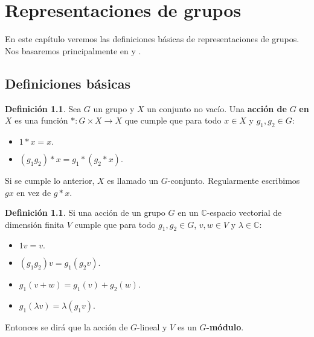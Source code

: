 \documentclass[12pt]{book}
\theoremstyle{definition}
\newtheorem{definition}[theorem]{Definición}
\newcounter{in}
\newcounter{ini}
\begin{document}
\chapter{Representaciones de grupos}
\label{cha:Representaciones de grupos}

En este capítulo veremos las definiciones básicas de representaciones
de grupos. Nos basaremos principalmente en \cite{MR882540} y
\cite{sagan2001symmetric}.

\section{Definiciones básicas}
\label{sec:basicas}

\begin{definition}
  Sea $G$ un grupo y $X$ un conjunto no vacío. Una \textbf{acción de}
  $G$ \textbf{en} $X$ es una función $\ast \colon G \times X \to X$
  que cumple que para todo $x \in X$ y $g_1,g_2 \in G$:
  \begin{itemize}
  \item $1 \ast x = x.$
    \item $(g_1g_2) \ast x = g_1 \ast (g_2 \ast x)$.
  \end{itemize}
\end{definition}

Si se cumple lo anterior, $X$ es llamado un $G$-conjunto. Regularmente
escribimos $gx$ en vez de $g \ast x$.

\begin{definition}
  Si una acción de un grupo $G$ en un $\mathbb{C}$-espacio vectorial de
  dimensión finita $V$ cumple que para todo $g_1,g_2 \in G$, $v,w \in V$ y
  $\lambda \in \mathbb{C}$:
  \begin{itemize}
  \item $1v = v.$
  \item $(g_1g_2)v = g_1(g_2v).$
  \item $g_1(v+w) = g_1(v) + g_2(w).$
    \item $g_1(\lambda v) = \lambda (g_1v).$
    \end{itemize}
    Entonces se dirá que la acción de $G$-lineal y $V$ es un $G$\textbf{-módulo}.
\end{definition}
\end{document}
